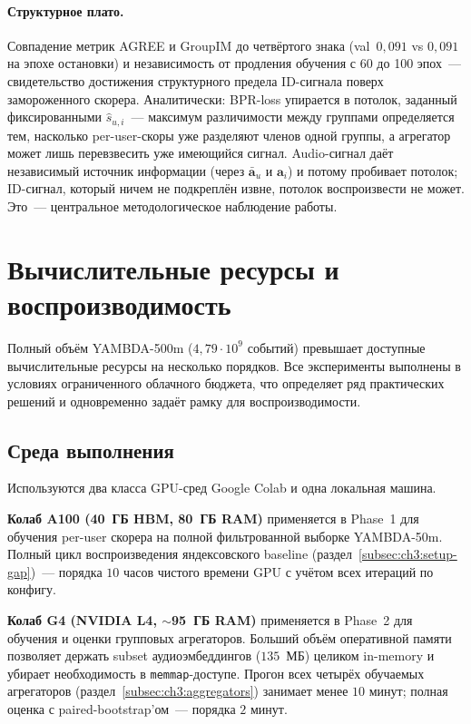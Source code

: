 \paragraph{Структурное плато.} Совпадение метрик AGREE и GroupIM до четвёртого знака (val~$0{,}091$ vs $0{,}091$ на эпохе остановки) и независимость от продления обучения с 60 до 100 эпох~--- свидетельство достижения структурного предела ID-сигнала поверх замороженного скорера. Аналитически: BPR-loss упирается в потолок, заданный фиксированными $\hat{s}_{u, i}$~--- максимум различимости между группами определяется тем, насколько per-user-скоры уже разделяют членов одной группы, а агрегатор может лишь перевзвесить уже имеющийся сигнал. Audio-сигнал даёт независимый источник информации (через $\bar{\mathbf{a}}_u$ и $\mathbf{a}_i$) и потому пробивает потолок; ID-сигнал, который ничем не подкреплён извне, потолок воспроизвести не может. Это~--- центральное методологическое наблюдение работы.

\section{Вычислительные ресурсы и воспроизводимость}\label{sec:ch3:compute}

Полный объём YAMBDA-500m ($4{,}79 \cdot 10^9$ событий) превышает доступные вычислительные ресурсы на несколько порядков. Все эксперименты выполнены в условиях ограниченного облачного бюджета, что определяет ряд практических решений и одновременно задаёт рамку для воспроизводимости.

\subsection{Среда выполнения}\label{subsec:ch3:compute-env}

Используются два класса GPU-сред Google Colab и одна локальная машина.

\textbf{Колаб A100 (40~ГБ HBM, 80~ГБ RAM)} применяется в Phase~1 для обучения per-user скорера на полной фильтрованной выборке YAMBDA-50m. Полный цикл воспроизведения яндексовского baseline (раздел~\ref{subsec:ch3:setup-gap})~--- порядка $10$ часов чистого времени GPU с учётом всех итераций по конфигу.

\textbf{Колаб G4 (NVIDIA L4, $\sim$95~ГБ RAM)} применяется в Phase~2 для обучения и оценки групповых агрегаторов. Больший объём оперативной памяти позволяет держать subset аудиоэмбеддингов ($135$~МБ) целиком in-memory и убирает необходимость в \texttt{memmap}-доступе. Прогон всех четырёх обучаемых агрегаторов (раздел~\ref{subsec:ch3:aggregators}) занимает менее $10$ минут; полная оценка с paired-bootstrap'ом~--- порядка $2$ минут.

